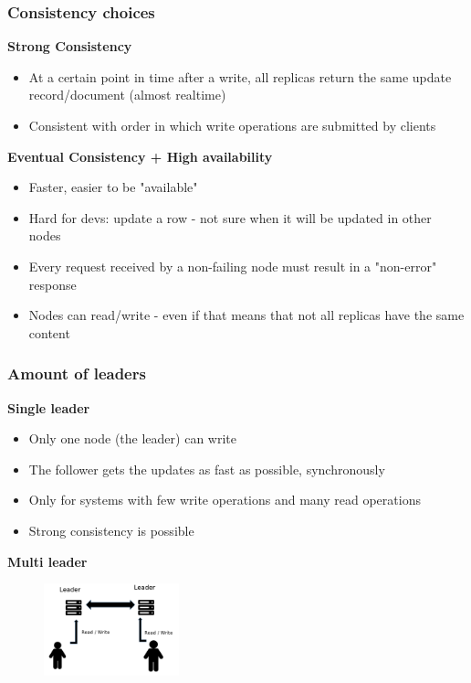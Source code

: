 \documentclass{article}
\begin{document}
\subsubsection{Consistency choices}

\textbf{Strong Consistency}

\begin{itemize}
    \item At a certain point in time after a write, all replicas return the same update record/document (almost realtime)
    \item Consistent with order in which write operations are submitted by clients
\end{itemize}

\textbf{Eventual Consistency + High availability}

\begin{itemize}
    \item Faster, easier to be "available"
    \item Hard for devs: update a row - not sure when it will be updated in other nodes
    \item Every request received by a non-failing node must result in a "non-error" response
    \item Nodes can read/write - even if that means that not all replicas have the same content
\end{itemize}

\subsubsection{Amount of leaders}

\textbf{Single leader}

\begin{itemize}
    \item Only one node (the leader) can write
    \item The follower gets the updates as fast as possible, synchronously
    \item Only for systems with few write operations and many read operations
    \item Strong consistency is possible
\end{itemize}

\textbf{Multi leader}
\begin{figure}[H]
    \centering
    \includegraphics[width=0.35\textwidth]{replication-multi-leader.png}
\end{figure}
\end{document}
